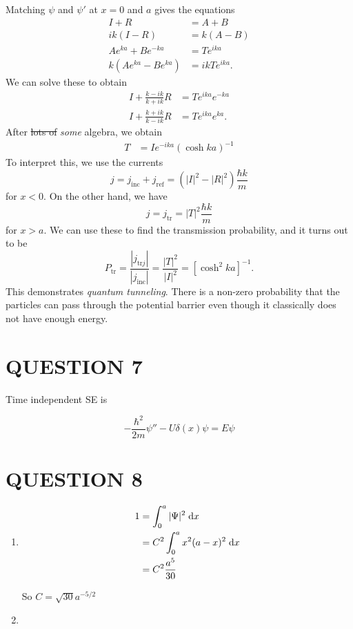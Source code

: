 \documentclass[a4paper]{article}
\begin{document}
Matching $\psi$ and $\psi'$ at $x = 0$ and $a$ gives the equations
\begin{align*}
I + R &= A + B\\
ik(I - R) &= k (A - B)\\
A e^{k a} + Be^{- k a} &= Te^{ika}\\
k(Ae^{k a} - Be^{k a}) &= ik Te^{ika}.
\end{align*}
We can solve these to obtain
\begin{align*}
I + \frac{k - ik}{k + ik}R &= Te^{ika} e^{-k a}\\
I + \frac{k + ik}{k - ik}R &= Te^{ika} e^{k a}.
\end{align*}
After \st{lots of} \emph{some} algebra, we obtain
\begin{align*}
T &= I e^{-ika}\left(\cosh k a\right)^{-1}
\end{align*}
To interpret this, we use the currents
\[
j = j_{\mathrm{inc}} + j_{\mathrm{ref}} = (|I|^2 - |R|^2) \frac{\hbar k}{m}
\]
for $x < 0$. On the other hand, we have
\[
j = j_{\mathrm{tr}} = |T|^2 \frac{\hbar k}{m}
\]
for $x > a$. We can use these to find the transmission probability, and it turns out to be
\[
P_{\mathrm{tr}} = \frac{|j_{\mathrm{tr}j}|}{|j_{\mathrm{inc}}|} = \frac{|T|^2}{|I|^2} = \left[ \cosh^{2} ka \right]^{-1}.
\]
This demonstrates \emph{quantum tunneling}. There is a non-zero probability that the particles can pass through the potential barrier even though it classically does not have enough energy.

\section{QUESTION 7}


Time independent SE is 

\[ - \frac{\hbar^{2}}{2m} \psi'' - U \delta(x) \psi = E \psi  \]




\section{QUESTION 8}

\begin{enumerate}
	\item \begin{align*}
	1 & = \int_{0}^{a} | \Psi |^{2} \; \mathrm{d} x  \\
	& = C^{2} \int_{0}^{a} x^{2} (a-x)^{2} \; \mathrm{d} x\\
	& = C^{2} \frac{a^{5}}{30} 
	\end{align*}
	
	So $ C = \sqrt{30 } a^{-5/2} $
	
	\item 
	
\end{enumerate}
\end{document}

